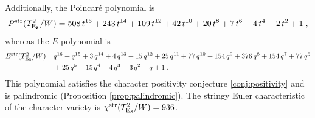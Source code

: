 \documentclass[11pt,english]{amsart}
\numberwithin{equation}{section}
\numberwithin{figure}{section}
\theoremstyle{plain}
\theoremstyle{plain}
\theoremstyle{definition}
\theoremstyle{remark}
\newcommand{\E}{\operatorname{E}}
\newcommand{\str}{\textup{str}}
\begin{document}
Additionally, the Poincar\'e polynomial is
\begin{align*}
    P^{\str}(T_{\E_8}^2/W) = 508 \, t^{16} + 243 \, t^{14} + 109 \, t^{12} + 42 \, t^{10} + 20 \, t^{8} + 7 \, t^{6} + 4 \, t^{4} + 2 \, t^{2} + 1\; ,
\end{align*}
whereas the $E$-polynomial is
\begin{align*}
E^{\str}(T_{\E_8}^2/W) =& q^{16} + q^{15} + 3 \, q^{14} + 4 \, q^{13} + 15 \, q^{12} + 25 \, q^{11} + 77 \, q^{10} + 154 \, q^{9} + 376 \, q^{8} + 154 \, q^{7} + 77 \, q^{6} \\
& + 25 \, q^{5} + 15 \, q^{4} + 4 \, q^{3} + 3 \, q^{2} + q + 1\; .
\end{align*}
This polynomial satisfies the character positivity conjecture \ref{conj:positivity} and is palindromic (Proposition \ref{prop:palindromic}). 
The stringy Euler characteristic of the character variety is $\chi^{\str}(T_{\E_8}^2/W)=936$.
\end{document}
